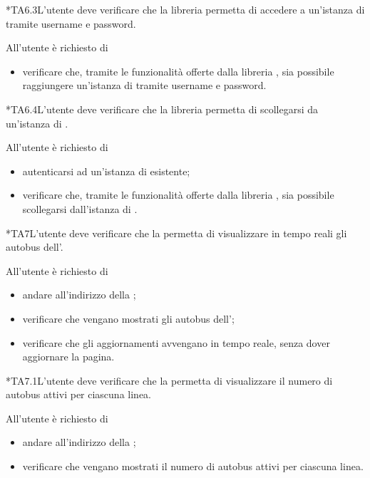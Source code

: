 	*{TA6.3}L'utente  deve verificare che la libreria  permetta di accedere a un'istanza di \projectname{} tramite username e password.
		
		All'utente  è richiesto di
		\begin{itemize}
			\item verificare che, tramite le funzionalità offerte dalla libreria , sia possibile raggiungere un'istanza di \projectname{} tramite username e password.
		\end{itemize}

	*{TA6.4}L'utente  deve verificare che la libreria  permetta di scollegarsi da un'istanza di \projectname{}.

		All'utente  è richiesto di
		\begin{itemize}
			\item autenticarsi ad un'istanza di \projectname{} esistente;
			\item verificare che, tramite le funzionalità offerte dalla libreria , sia possibile scollegarsi dall'istanza di \projectname{}.
		\end{itemize}

	*{TA7}L'utente deve verificare che la  permetta di visualizzare in tempo reali gli autobus dell'.

		All'utente è richiesto di
		\begin{itemize}
			\item andare all'indirizzo della ;
			\item verificare che vengano mostrati gli autobus dell';
			\item verificare che gli aggiornamenti avvengano in tempo reale, senza dover aggiornare la pagina.
		\end{itemize}

	*{TA7.1}L'utente deve verificare che la  permetta di visualizzare il numero di autobus attivi per ciascuna linea.

		All'utente è richiesto di
		\begin{itemize}
			\item andare all'indirizzo della ;
			\item verificare che vengano mostrati il numero di autobus attivi per ciascuna linea.
		\end{itemize}

